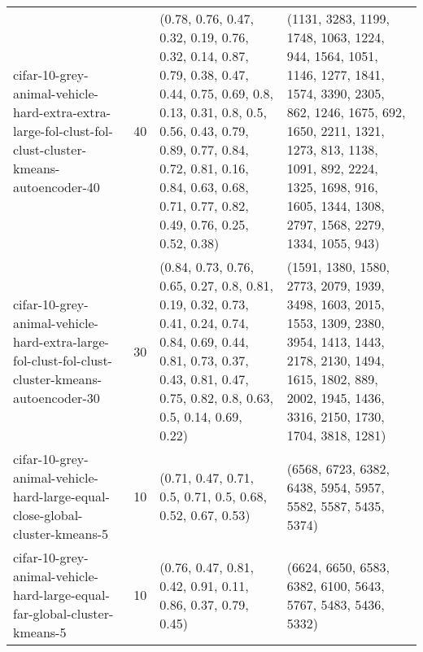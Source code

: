 \begin{longtable}{llll}
        cifar-10-grey-animal-vehicle-hard-extra-extra-large-fol-clust-fol-clust-cluster-kmeans-autoencoder-40 &             40 &                                                             (0.78, 0.76, 0.47, 0.32, 0.19, 0.76, 0.32, 0.14, 0.87, 0.79, 0.38, 0.47, 0.44, 0.75, 0.69, 0.8, 0.13, 0.31, 0.8, 0.5, 0.56, 0.43, 0.79, 0.89, 0.77, 0.84, 0.72, 0.81, 0.16, 0.84, 0.63, 0.68, 0.71, 0.77, 0.82, 0.49, 0.76, 0.25, 0.52, 0.38) &                                                                 (1131, 3283, 1199, 1748, 1063, 1224, 944, 1564, 1051, 1146, 1277, 1841, 1574, 3390, 2305, 862, 1246, 1675, 692, 1650, 2211, 1321, 1273, 813, 1138, 1091, 892, 2224, 1325, 1698, 916, 1605, 1344, 1308, 2797, 1568, 2279, 1334, 1055, 943) \\
              cifar-10-grey-animal-vehicle-hard-extra-large-fol-clust-fol-clust-cluster-kmeans-autoencoder-30 &             30 &                                                                                                                         (0.84, 0.73, 0.76, 0.65, 0.27, 0.8, 0.81, 0.19, 0.32, 0.73, 0.41, 0.24, 0.74, 0.84, 0.69, 0.44, 0.81, 0.73, 0.37, 0.43, 0.81, 0.47, 0.75, 0.82, 0.8, 0.63, 0.5, 0.14, 0.69, 0.22) &                                                                                                                       (1591, 1380, 1580, 2773, 2079, 1939, 3498, 1603, 2015, 1553, 1309, 2380, 3954, 1413, 1443, 2178, 2130, 1494, 1615, 1802, 889, 2002, 1945, 1436, 3316, 2150, 1730, 1704, 3818, 1281) \\
                                  cifar-10-grey-animal-vehicle-hard-large-equal-close-global-cluster-kmeans-5 &             10 &                                                                                                                                                                                                                                                (0.71, 0.47, 0.71, 0.5, 0.71, 0.5, 0.68, 0.52, 0.67, 0.53) &                                                                                                                                                                                                                                              (6568, 6723, 6382, 6438, 5954, 5957, 5582, 5587, 5435, 5374) \\
                                    cifar-10-grey-animal-vehicle-hard-large-equal-far-global-cluster-kmeans-5 &             10 &                                                                                                                                                                                                                                              (0.76, 0.47, 0.81, 0.42, 0.91, 0.11, 0.86, 0.37, 0.79, 0.45) &                                                                                                                                                                                                                                              (6624, 6650, 6583, 6382, 6100, 5643, 5767, 5483, 5436, 5332) \\

\end{longtable}
